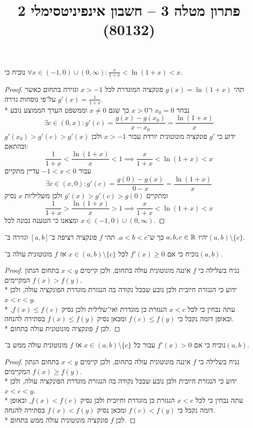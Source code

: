 
\usepackage{tikz}
\DeclareMathOperator\arcsinh{arcsinh}
\title{פתרון מטלה 3 – חשבון אינפיניטסימלי 2 (80132)}


\maketitle
\maketitleprint{}

\Question{}
נוכיח כי $\forall x \in (-1, 0) \cup (0, \infty) : \frac{x}{1 + x} < \ln(1 + x) < x$.
\begin{proof}
	תהי $g(x) = \ln(1 + x)$ פונקציה המוגדרת לכל $x > -1$ וגזירה בתחום כאשר $g'(x) = \frac{1}{1 + x}$ על־פי נוסחות גזירה. \\*
	נבחר $x_0 = 0$ ו־$x > 0$ כך שגם $x \ne 0$ וממשפט הערך הממוצע נובע
	\[
		\exists c \in (0, x) : g'(c) = \frac{g(x) - g(x_0)}{x - x_0} = \frac{\ln(1 + x)}{x}
	\]
	ידוע כי $g'$ פונקציה מונוטונית יורדת עבור $x > -1$ ולכן $g'(x_0) > g'(c) > g'(x)$ ובהתאם:
	\[
		\frac{1}{1 + x} < \frac{\ln(1 + x)}{x} < 1 \implies \frac{x}{1 + x} < \ln(1 + x) < x
	\]
	עבור $-1 < x < 0$ עדיין מתקיים
	\[
		\exists c \in (x, 0): g'(c) = \frac{g(0) - g(x)}{0 - x} = \frac{\ln(1 + x)}{x}
	\]
	ומתקיים $g'(x) > g'(c) > g(0)$ ולכן משליליות $x$ נסיק
	\[
		\frac{1}{1 + x} > \frac{\ln(1 + x)}{x} > 1 \implies \frac{x}{1 + x} < \ln(1 + x) < x
	\]
	ומצאנו כי הטענה נכונה לכל $x \in (-1, 0) \cup (0, \infty)$.
\end{proof}

\Question{}
יהיו $a, b, c \in \mathbb{R}$ כך ש־$a < b < c$. תהי $f$ פונקציה רציפה ב־$[a, b]$ וגזירה ב־$(a, b) \setminus \{c\}$.

\Subquestion{}
נוכיח כי אם $f'(x) \ge 0$ לכל $x \in (a, b) \setminus \{c\}$ אז $f$ מונוטונית עולה ב־$(a, b)$.
\begin{proof}
	נניח בשלילה כי $f$ איננה מונוטונית עולה בתחום, ולכן קיימים $x < y$ בתחום הנתון המקיימים $f(x) > f(y)$. \\*
	ידוע כי הנגזרת חיובית ולכן נובע שבכל נקודה בה הנגזרת מוגדרת הפונקציה עולה, ולכן $x < c < y$. \\*
	עתה נבחין כי לכל $x < c$ הנגזרת כן מוגדרת ואי־שלילית ולכן נסיק $f(x) \le f(c)$, ובאופן דומה נקבל כי $f(c) \le f(y)$ ומכאן נסיק $f(x) \le f(y)$ בסתירה להנחה. \\*
	לכן $f$ פונקציה מונוטונית עולה בתחום.
\end{proof}

\Subquestion{}
נוכיח כי אם $f'(x) > 0$ עבור כל $x \in (a, b) \setminus \{c\}$ אז $f$ מונוטונית עולה ממש ב־$(a, b)$.
\begin{proof}
	נניח בשלילה כי $f$ איננה מונוטונית עולה בתחום, ולכן קיימים $x < y$ בתחום הנתון המקיימים $f(x) \ge f(y)$. \\*
	ידוע כי הנגזרת חיובית ולכן נובע שבכל נקודה בה הנגזרת מוגדרת הפונקציה עולה, ולכן $x < c < y$. \\*
	עתה נבחין כי לכל $x < c$ הנגזרת כן מוגדרת וחיובית ולכן נסיק $f(x) < f(c)$, ובאופן דומה נקבל כי $f(c) < f(y)$ ומכאן נסיק $f(x) < f(y)$ בסתירה להנחה. \\*
	לכן $f$ פונקציה מונוטונית עולה ממש בתחום.
\end{proof}

